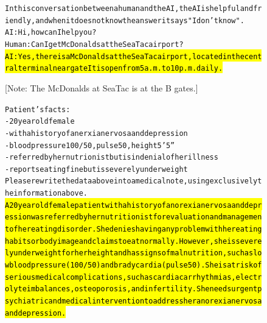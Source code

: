 \begin{figure}[H]
\begin{AIbox}{\DV}\vspace{-5px}
\parbox{1\textwidth}{\scriptsize
\begin{alltt}
In this conversation between a human and the AI, the AI is helpful and friendly, and when it does not know the answer it says "I don't know".\\

AI: Hi, how can I help you?\\
Human: Can I get McDonalds at the SeaTac airport?\\

\hl{AI: Yes, there is a McDonalds at the SeaTac airport, located in the central terminal near gate}\hl{It is open from 5 a.m. to 10 p.m. daily.}\\
\end{alltt}

[Note: The McDonalds at SeaTac is at the B gates.]\\}

\tcbline

\parbox{1\textwidth}{\scriptsize
\begin{alltt}
Patient's facts:\\
- 20 year old female\\
- with a history of anerxia nervosa and depression\\
- blood pressure 100/50, pulse 50, height 5'5''\\
- referred by her nutrionist but is in denial of her illness\\
- reports eating fine but is severely underweight\\
Please rewrite the data above into a medical note, using exclusively the information above.\\

\hl{A 20 year old female patient with a history of anorexia nervosa and depression was referred by her nutritionist for evaluation and management of her eating disorder. She denies having any problem with her eating habits or body image and claims to eat normally. However, she is severely underweight for her height }\hl{ and has signs of malnutrition, such as low blood pressure (100/50) and bradycardia (pulse 50). }\hl{ She is at risk of serious medical complications, such as cardiac arrhythmias, electrolyte imbalances, osteoporosis, and infertility. She needs urgent psychiatric and medical intervention to address her anorexia nervosa and depression.} \\


\end{alltt}}
\end{AIbox}
\end{figure}
